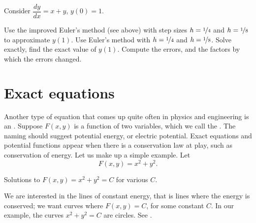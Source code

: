 \begin{exercise}
Consider $\dfrac{dy}{dx} = x+y$, $y(0)=1$.
\begin{tasks}
\task Use the improved Euler's method (see above) with step sizes $h=\nicefrac{1}{4}$ and $h=\nicefrac{1}{8}$
to approximate $y(1)$.
\task Use Euler's method with
$h=\nicefrac{1}{4}$ and $h=\nicefrac{1}{8}$.
\task Solve exactly, find the exact value of
$y(1)$.
\task Compute the errors, and the factors by which the errors changed.
\end{tasks}
\end{exercise}


\sectionnewpage
\section{Exact equations}
\label{exact:section}


Another type of equation that comes up quite often in physics and
engineering is an
\emph{}.
Suppose $F(x,y)$ is a function of two variables, which we call the
\emph{}.  The naming should suggest 
potential energy, or electric potential.  Exact equations and potential
functions appear when there is a conservation law at play, such as 
conservation of energy.
Let us make up a simple example.  Let
\begin{equation*}
F(x,y) = x^2+y^2 .
\end{equation*}

\begin{mywrapfig}[17]{3.25in}
\capstart
{}
\caption{Solutions to $F(x,y) = x^2+y^2 = C$ for various
$C$.\label{exact:circlesfig}}
\end{mywrapfig}
We are interested in the lines of constant energy, that is lines where
the energy is conserved;  we want curves where $F(x,y) = C$,
for some constant $C$.  In
our example, the curves $x^2+y^2=C$ are circles.  See
.

